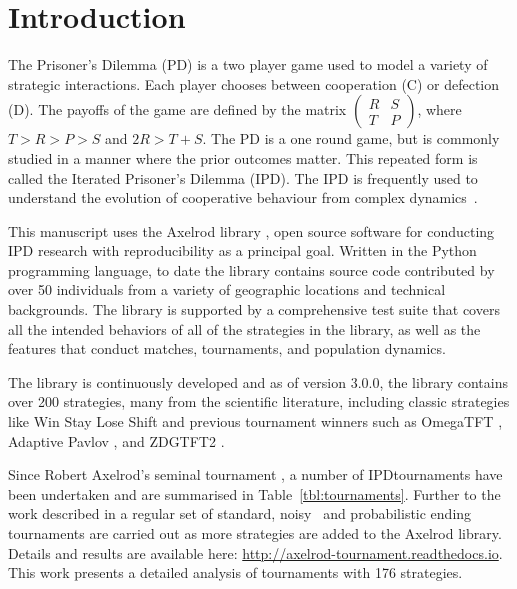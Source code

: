 \documentclass[10pt,letterpaper]{article}
\begin{document}
\section*{Introduction}

The Prisoner's Dilemma (PD) is a two player game
used to model a variety of strategic interactions. Each player chooses
between cooperation (C) or defection (D). The payoffs of
the game are defined by the matrix $\begin{pmatrix} R & S \\ T & P
\end{pmatrix}$, where $T > R > P > S$ and $2R > T + S$. The PD is a one
round game, but is commonly studied in a manner where the prior outcomes
matter. This repeated form is called the Iterated Prisoner's
Dilemma (IPD).
The IPD is 
frequently used  to understand the evolution of cooperative behaviour from complex
dynamics~\cite{Axelrod1984}.

This manuscript uses the Axelrod library \cite{knight2016open, axelrodproject},
open source software for conducting IPD research with
reproducibility as a principal goal. Written in the Python programming language,
to date the library contains source code contributed by over 50 individuals
from a variety of geographic locations and technical backgrounds. The library
is supported by a comprehensive test suite that covers all the intended
behaviors of all of the strategies in the library, as well as the features that
conduct matches, tournaments, and population dynamics.

The library is continuously developed and as of version 3.0.0, the library
contains over 200 strategies, many from the scientific literature, including
classic strategies like Win Stay Lose Shift \cite{nowak1993strategy} and
previous tournament winners such as OmegaTFT \cite{slany2007some}, Adaptive
Pavlov \cite{li2007design}, and ZDGTFT2 \cite{Stewart2012}.

Since Robert Axelrod's seminal tournament \cite{Axelrod1980a}, a number of
IPD\@ tournaments have been undertaken and are summarised in
Table~\ref{tbl:tournaments}. Further to the work described in
\cite{knight2016open} a regular set of standard, noisy~\cite{Bendor1991} and
probabilistic ending~\cite{Axelrod1980b} tournaments are carried out as more
strategies are added to the Axelrod library.
Details and results are available here:
\url{http://axelrod-tournament.readthedocs.io}. This work presents a detailed
analysis of tournaments with 176 strategies.
\end{document}
